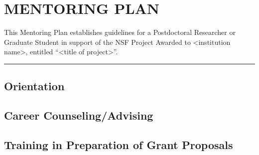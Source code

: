 \documentclass[../preamble.tex]{subfiles}
\begin{document}
\section{MENTORING PLAN}




This Mentoring Plan establishes guidelines for a Postdoctoral Researcher or Graduate Student in support of the NSF Project Awarded to <institution name>, entitled ``<title of project>''. 
\vpn\rule{\textwidth}{0.4pt}
\subsection{Orientation} %
\subsection{Career Counseling/Advising} %
\subsection{Training in Preparation of Grant Proposals} %
\end{document}
